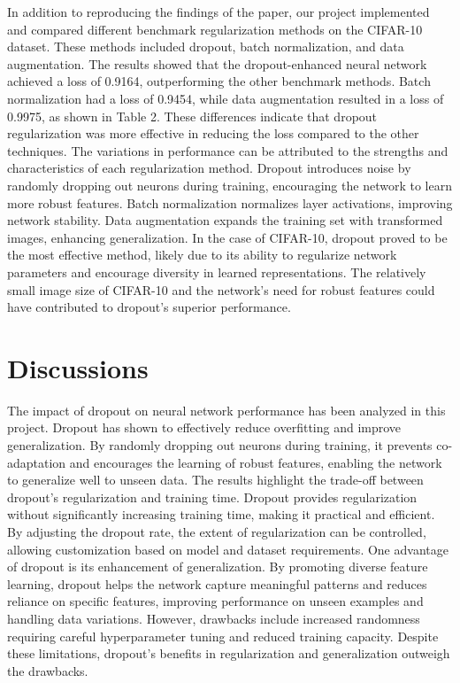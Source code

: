 \documentclass{article}
\begin{document}
In addition to reproducing the findings of the paper, our project implemented and compared different benchmark regularization methods on the CIFAR-10 dataset. These methods included dropout, batch normalization, and data augmentation.
The results showed that the dropout-enhanced neural network achieved a loss of 0.9164, outperforming the other benchmark methods. Batch normalization had a loss of 0.9454, while data augmentation resulted in a loss of 0.9975, as shown in Table 2. These differences indicate that dropout regularization was more effective in reducing the loss compared to the other techniques.
The variations in performance can be attributed to the strengths and characteristics of each regularization method. Dropout introduces noise by randomly dropping out neurons during training, encouraging the network to learn more robust features. Batch normalization normalizes layer activations, improving network stability. Data augmentation expands the training set with transformed images, enhancing generalization.
In the case of CIFAR-10, dropout proved to be the most effective method, likely due to its ability to regularize network parameters and encourage diversity in learned representations. The relatively small image size of CIFAR-10 and the network's need for robust features could have contributed to dropout's superior performance.

\section{Discussions}
The impact of dropout on neural network performance has been analyzed in this project. Dropout has shown to effectively reduce overfitting and improve generalization. By randomly dropping out neurons during training, it prevents co-adaptation and encourages the learning of robust features, enabling the network to generalize well to unseen data.
The results highlight the trade-off between dropout's regularization and training time. Dropout provides regularization without significantly increasing training time, making it practical and efficient. By adjusting the dropout rate, the extent of regularization can be controlled, allowing customization based on model and dataset requirements.
One advantage of dropout is its enhancement of generalization. By promoting diverse feature learning, dropout helps the network capture meaningful patterns and reduces reliance on specific features, improving performance on unseen examples and handling data variations.
However, drawbacks include increased randomness requiring careful hyperparameter tuning and reduced training capacity. Despite these limitations, dropout's benefits in regularization and generalization outweigh the drawbacks.
\end{document}
